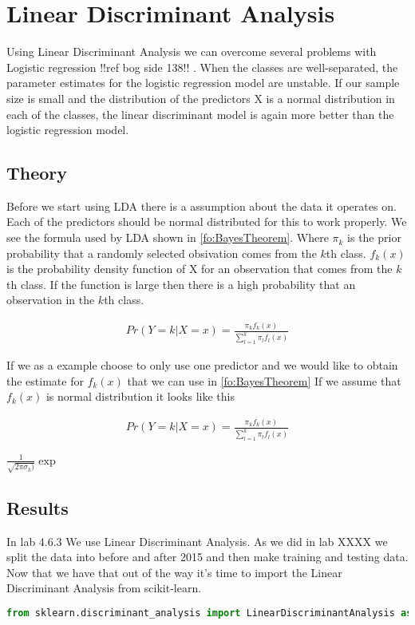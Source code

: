 \section{Linear Discriminant Analysis}
Using Linear Discriminant Analysis we can overcome several problems with Logistic regression {  !!ref bog side 138!! }. When the classes are well-separated, the parameter estimates for the
logistic regression model are unstable. If our sample size is small and the distribution of the predictors X is a normal distribution in each of the classes, the linear discriminant model is again more better than the logistic regression model.
\subsection{Theory}
Before we start using LDA there is a  assumption about the data it operates on. Each of the predictors should be normal distributed for this to work properly. We see the formula used by LDA shown in \ref{fo:BayesTheorem}. Where $\pi_k$ is the prior probability that a randomly selected obsivation comes from the $k$th class. $f_k(x)$ is the probability density function of X for an observation that comes from the $k$th class. If the function is large then there is a high probability that an observation in the $k$th class.

\begin{align}\label{fo:BayesTheorem}
Pr(Y=k|X=x) = \frac{\pi_k f_k(x)}{ \sum_{l=1}^{k}\pi_l f_l(x) }
\end{align}

If we as a example choose to only use one predictor and we would like to obtain the estimate for $f_k(x)$ that we can use in \ref{fo:BayesTheorem} If we assume that $f_k(x)$ is normal distribution it looks like this

\begin{align}\label{fo:BayesTheorem}
Pr(Y=k|X=x) = \frac{\pi_k f_k(x)}{ \sum_{l=1}^{k}\pi_l f_l(x) }
\end{align}

$
\frac{1}{\sqrt{2\pi\sigma_k)}}\exp{}
$

\subsection{Results}
In lab 4.6.3 We use Linear Discriminant Analysis. As we did in lab XXXX we split the data into before and after 2015 and then make training and testing data. Now that we have that out of the way it's time to import the Linear Discriminant Analysis from scikit-learn.
\begin{lstlisting}[language=Python]
from sklearn.discriminant_analysis import LinearDiscriminantAnalysis as LDA
\end{lstlisting}

